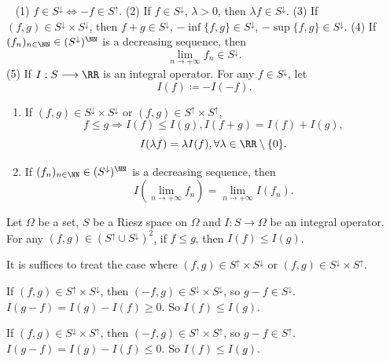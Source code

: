 \begin{remark}
    \ \newline
    (1) $f\in S^{\downarrow}\Leftrightarrow -f\in S^{\uparrow}$.
    \newline
    (2) If $f\in S^{\downarrow}$, $\lambda>0$, then $\lambda f \in S^{\downarrow}$.
    \newline
    (3) If $(f,g)\in S^{\downarrow}\times S^{\downarrow}$, then $f+g\in S^{\downarrow}$, $-\inf\{f,g\}\in S^{\downarrow}$, $-\sup\{f,g\}\in S^{\downarrow}$.
    \newline
    (4) If $(f_n)_{n\in\NN}\in (S^{\downarrow})^{\NN}$ is a decreasing sequence, then $$ \lim_{n\rightarrow +\infty}f_n\in S^{\downarrow}.$$
    \newline
    (5) If $I:S\longrightarrow \RR$ is an integral operator. For any $f\in S^{\downarrow}$, let
    $$ I(f)\coloneq - I(-f).$$
    \begin{enumerate}
        \item If $(f,g)\in S^{\downarrow}\times S^{\downarrow}$ or $(f,g)\in S^{\uparrow}\times S^{\uparrow}$,
        $$ f\le g\Rightarrow I(f)\le  I(g), I(f+g)=I(f)+I(g),$$
        $$I(\lambda f)=\lambda I(f), \forall \lambda\in \RR\setminus\{0\}.$$
        \item If $(f_n)_{n\in\NN}\in (S^{\downarrow})^{\NN}$ is a decreasing sequence, then $$ I(\lim_{n\rightarrow +\infty}f_n)=\lim_{n\rightarrow +\infty}I(f_n).$$
    \end{enumerate}
\end{remark}
\begin{propositionenv}
    Let $\Omega$ be a set, $S$ be a Riesz space on $\Omega$ and $I:S\longrightarrow\Omega$ be an integral operator. For any $(f,g)\in (S^{\uparrow}\cup S^{\downarrow})^2$, if $f\le g$, then $I(f)\le I(g)$.
\end{propositionenv}
\begin{proofenv}
    It is suffices to treat the case where $(f,g)\in S^{\uparrow}\times S^{\downarrow}$ or $(f,g)\in S^{\downarrow}\times S^{\uparrow}.$

    \quad If $(f,g)\in S^{\uparrow}\times S^{\downarrow}$, then $(-f,g)\in S^{\downarrow}\times S^{\downarrow}$, so $g-f\in S^{\downarrow}$. $I(g-f)=I(g)-I(f)\ge 0$. So $I(f)\le I(g)$.

    \quad If $(f,g)\in S^{\downarrow}\times S^{\uparrow}$, then $(-f,g)\in S^{\uparrow}\times S^{\uparrow}$, so $g-f\in S^{\uparrow}$. $I(g-f)=I(g)-I(f)\le 0$. So $I(f)\le I(g)$.
\end{proofenv}
